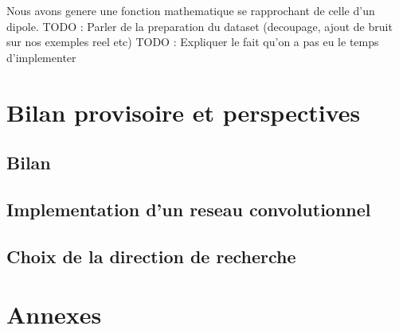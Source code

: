 \documentclass[a4paper, 12pt, titlepage, oneside]{article}
\begin{document}
	Nous avons genere une fonction mathematique se rapprochant de celle d'un dipole. 
	TODO : Parler de la preparation du dataset (decoupage, ajout de bruit sur nos exemples reel etc)
	TODO : Expliquer le fait qu'on a pas eu le temps d'implementer
\newpage
\section{Bilan provisoire et perspectives}
	\subsection{Bilan} %
	\subsection{Implementation d'un reseau convolutionnel}
	\subsection{Choix de la direction de recherche}

\newpage
\section{Annexes}
\end{document}
